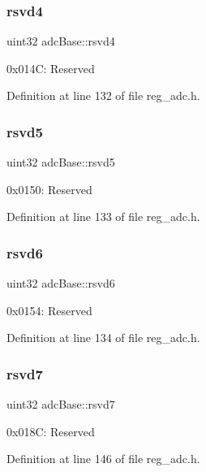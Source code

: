 \subsubsection{\texorpdfstring{rsvd4}{rsvd4}}
{\footnotesize\ttfamily uint32 adc\+Base\+::rsvd4}

0x014C\+: Reserved 

Definition at line 132 of file reg\+\_\+adc.\+h.

\mbox{\label{structadcBase_abe75adeafe981064dc22b03772d7dfca}} 
\subsubsection{\texorpdfstring{rsvd5}{rsvd5}}
{\footnotesize\ttfamily uint32 adc\+Base\+::rsvd5}

0x0150\+: Reserved 

Definition at line 133 of file reg\+\_\+adc.\+h.

\mbox{\label{structadcBase_a93ad1980e793c3b2f39c37ce8825ab24}} 
\subsubsection{\texorpdfstring{rsvd6}{rsvd6}}
{\footnotesize\ttfamily uint32 adc\+Base\+::rsvd6}

0x0154\+: Reserved 

Definition at line 134 of file reg\+\_\+adc.\+h.

\mbox{\label{structadcBase_ab7c3a3fe7079c606778288bb08c18bf1}} 
\subsubsection{\texorpdfstring{rsvd7}{rsvd7}}
{\footnotesize\ttfamily uint32 adc\+Base\+::rsvd7}

0x018C\+: Reserved 

Definition at line 146 of file reg\+\_\+adc.\+h.

\mbox{\label{structadcBase_abd20ccb8b7198d4988ea394463d237e3}} 
